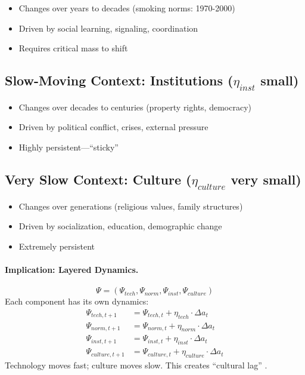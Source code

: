 \begin{itemize}[nosep]
  \item Changes over years to decades (smoking norms: 1970-2000)
  \item Driven by social learning, signaling, coordination
  \item Requires critical mass to shift
\end{itemize}

\subsection{Slow-Moving Context: Institutions ($\eta_{inst}$ small)}

\begin{itemize}[nosep]
  \item Changes over decades to centuries (property rights, democracy)
  \item Driven by political conflict, crises, external pressure
  \item Highly persistent---``sticky''
\end{itemize}

\subsection{Very Slow Context: Culture ($\eta_{culture}$ very small)}

\begin{itemize}[nosep]
  \item Changes over generations (religious values, family structures)
  \item Driven by socialization, education, demographic change
  \item Extremely persistent
\end{itemize}

\paragraph{Implication: Layered Dynamics.}
\begin{definition}
\begin{equation}
\Psi = (\Psi_{tech}, \Psi_{norm}, \Psi_{inst}, \Psi_{culture})
\label{eq:layered-context}
\end{equation}
Each component has its own dynamics:
\begin{align}
\Psi_{tech, t+1} &= \Psi_{tech, t} + \eta_{tech} \cdot \Delta a_t \\
\Psi_{norm, t+1} &= \Psi_{norm, t} + \eta_{norm} \cdot \Delta a_t \\
\Psi_{inst, t+1} &= \Psi_{inst, t} + \eta_{inst} \cdot \Delta a_t \\
\Psi_{culture, t+1} &= \Psi_{culture, t} + \eta_{culture} \cdot \Delta a_t
\end{align}
Technology moves fast; culture moves slow. This creates ``cultural lag'' \citep{ogburn1922}.
\end{definition}

